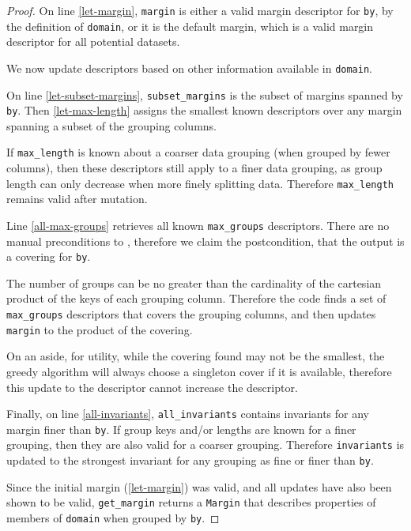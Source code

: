 \documentclass{article}
\begin{document}
\begin{proof} 
    On line \ref{let-margin}, \texttt{margin} is either a valid margin descriptor 
    for \texttt{by}, by the definition of \texttt{domain},
    or it is the default margin, which is a valid margin descriptor for all potential datasets. 

    We now update descriptors based on other information available in \texttt{domain}.

    On line \ref{let-subset-margins}, 
    \texttt{subset\_margins} is the subset of margins spanned by \texttt{by}.
    Then \ref{let-max-length} assigns the smallest known descriptors over any margin spanning a subset of the grouping columns.

    If \texttt{max\_length} is known about a coarser data grouping (when grouped by fewer columns),
    then these descriptors still apply to a finer data grouping, as group length can only decrease when more finely splitting data.
    Therefore \texttt{max\_length} remains valid after mutation.

    Line \ref{all-max-groups} retrieves all known \texttt{max\_groups} descriptors.
    There are no manual preconditions to , 
    therefore we claim the postcondition, that the output is a covering for \texttt{by}.

    The number of groups can be no greater than the cardinality of the cartesian product of the keys of each grouping column.
    Therefore the code finds a set of \texttt{max\_groups} descriptors that covers the grouping columns,
    and then updates \texttt{margin} to the product of the covering.

    On an aside, for utility, while the covering found may not be the smallest, 
    the greedy algorithm will always choose a singleton cover if it is available,
    therefore this update to the descriptor cannot increase the descriptor.

    Finally, on line \ref{all-invariants}, \texttt{all\_invariants} contains invariants for any margin finer than \texttt{by}.
    If group keys and/or lengths are known for a finer grouping, then they are also valid for a coarser grouping.
    Therefore \texttt{invariants} is updated to the strongest invariant for any grouping as fine or finer than \texttt{by}.

    Since the initial margin (\ref{let-margin}) was valid, and all updates have also been shown to be valid,
    \texttt{get\_margin} returns a \texttt{Margin} that describes properties of members of \texttt{domain} when grouped by \texttt{by}.
\end{proof}
\end{document}
